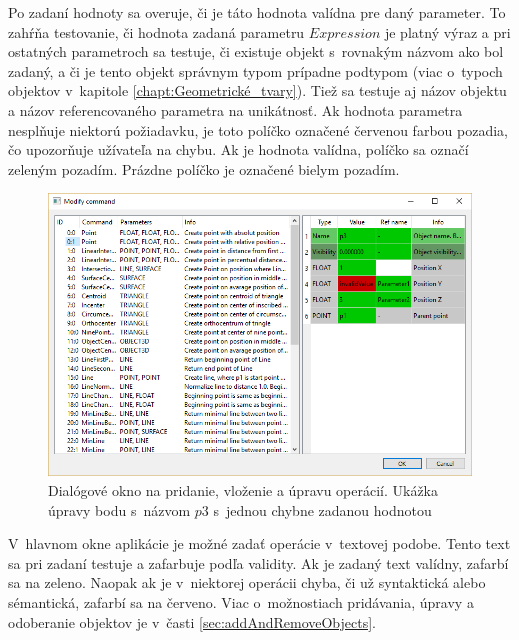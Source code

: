 Po zadaní hodnoty sa overuje, či je táto hodnota valídna pre daný parameter. To zahŕňa testovanie, či hodnota zadaná parametru $Expression$ je platný výraz a pri ostatných parametroch sa testuje, či existuje objekt s~rovnakým názvom ako bol zadaný, a či je tento objekt správnym typom prípadne podtypom (viac o~typoch objektov v~kapitole  \ref{chapt:Geometrické_tvary}). Tiež sa testuje aj názov objektu a názov referencovaného parametra na unikátnosť.
Ak hodnota parametra nesplňuje niektorú požiadavku, je toto políčko označené červenou farbou pozadia, čo upozorňuje užívateľa na chybu. Ak je hodnota valídna, políčko sa označí zeleným pozadím. Prázdne políčko je označené bielym pozadím. 

\begin{figure}[H]
	\centering
	\includegraphics[width=1\textwidth]{obrazky-figures/Dialog.png}
	\caption{Dialógové okno na pridanie, vloženie a úpravu operácií. Ukážka úpravy bodu s~názvom $p3$ s~jednou chybne zadanou hodnotou }
	\label{fig:dialogWindow}
\end{figure}
V~hlavnom okne aplikácie je možné zadať operácie v~textovej podobe. Tento text sa pri zadaní testuje a zafarbuje podľa validity. Ak je zadaný text valídny, zafarbí sa na zeleno. Naopak ak je v~niektorej operácii chyba, či už syntaktická alebo sémantická, zafarbí sa na červeno. Viac o~možnostiach pridávania, úpravy a odoberanie objektov je v~časti \ref{sec:addAndRemoveObjects}.








